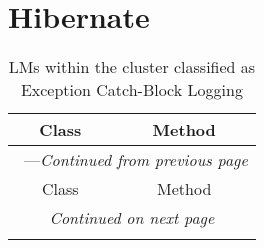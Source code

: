 \section{Hibernate}\label{hibernate}

\begin{center}
\begin{longtable}{ll}
\caption{LMs within the cluster classified as Exception Catch-Block Logging}\\
\toprule\multicolumn{1}{c}{Class}&\multicolumn{1}{c}{Method}\\\midrule
\endfirsthead

\multicolumn{2}{c}{\tablename\ \thetable{}---\textit{Continued from previous page}} \\\midrule
\multicolumn{1}{c}{Class}&\multicolumn{1}{c}{Method}\\\midrule
\endhead
\multicolumn{2}{c}{\textit{Continued on next page}}\\\midrule
\endfoot
\bottomrule
\endlastfoot


\end{longtable}
\end{center}
